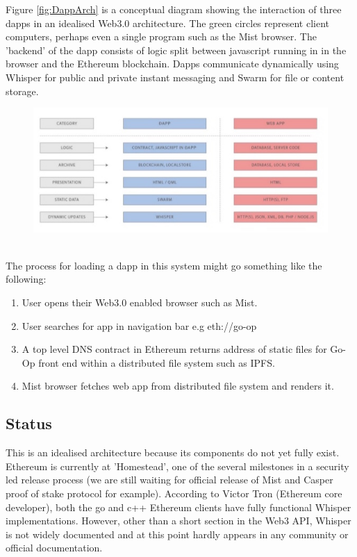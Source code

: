 Figure \ref{fig:DappArch} is a conceptual diagram showing the interaction of three dapps in an idealised Web3.0 architecture. The green circles represent client computers, perhaps even a single program such as the Mist browser. The 'backend' of the dapp consists of logic split between javascript running in in the browser and the Ethereum blockchain. Dapps communicate dynamically using Whisper for public and private instant messaging and Swarm for file or content storage.\\
\begin{figure}
\centering
\includegraphics[width=\textwidth]{Figures/DappVWeb}
\decoRule
\caption[]{}
\label{fig:DappVWeb}
\end{figure}
\\
The process for loading a dapp in this system might go something like the following:\\
\begin{enumerate}
\item User opens their Web3.0 enabled browser such as Mist.
\item User searches for app in navigation bar e.g eth://go-op
\item A top level DNS contract in Ethereum returns address of static files for Go-Op front end within a distributed file system such as IPFS.
\item Mist browser fetches web app from distributed file system and renders it.
\end{enumerate}

\subsection{Status}
This is an idealised architecture because its components do not yet fully exist. Ethereum is currently at 'Homestead', one of the several milestones in a security led release process\cite{VinayLaunch} (we are still waiting for official release of Mist and Casper proof of stake protocol for example). According to Victor Tron (Ethereum core developer), both the go and c++ Ethereum clients have fully functional Whisper implementations\cite{TronStack}. However, other than a short section in the Web3 API, Whisper is not widely documented and at this point hardly appears in any community or official documentation.\\

